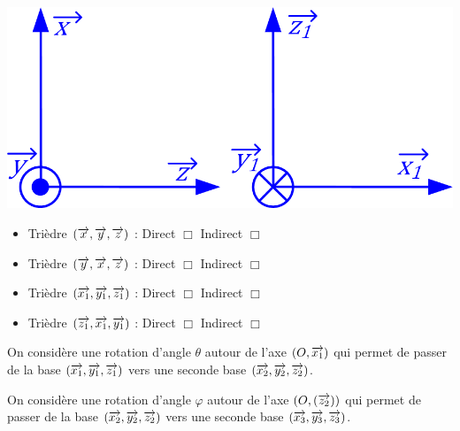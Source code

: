 \documentclass[10pt]{article}
\begin{document}
\begin{minipage}[c]{.4\linewidth}
\begin{center}
\includegraphics[width=.95\textwidth]{images/fig_01}
\end{center}
\end{minipage}\hfill
\begin{minipage}[c]{.48\linewidth}
\begin{itemize}
\item Trièdre $\left(\overrightarrow{x},\overrightarrow{y},\overrightarrow{z}\right)$ : \hspace{1cm} Direct $\Box$ \hspace{1cm} Indirect $\Box$
\item Trièdre $\left(\overrightarrow{y},\overrightarrow{x},\overrightarrow{z}\right)$ : \hspace{1cm} Direct $\Box$ \hspace{1cm} Indirect $\Box$
\item Trièdre $\left(\overrightarrow{x_1},\overrightarrow{y_1},\overrightarrow{z_1}\right)$ : \hspace{1cm} Direct $\Box$ \hspace{1cm} Indirect $\Box$
\item Trièdre $\left(\overrightarrow{z_1},\overrightarrow{x_1},\overrightarrow{y_1}\right)$ : \hspace{1cm} Direct $\Box$ \hspace{1cm} Indirect $\Box$
\end{itemize}
\end{minipage}

\vspace{1cm}
On considère une rotation d'angle $\theta$ autour de l'axe $(O,\overrightarrow{x_1})$ qui permet de passer de la base $\left(\overrightarrow{x_1},\overrightarrow{y_1}, \overrightarrow{z_1}\right)$ vers une seconde base $\left(\overrightarrow{x_2},\overrightarrow{y_2}, \overrightarrow{z_2}\right)$.

On considère une rotation d’angle $\varphi$ autour de l’axe $(O,(\overrightarrow{z_2}))$ qui permet de passer de la base $\left(\overrightarrow{x_2},\overrightarrow{y_2}, \overrightarrow{z_2}\right)$ vers une seconde base $\left(\overrightarrow{x_3},\overrightarrow{y_3}, \overrightarrow{z_3}\right)$.
\end{document}
